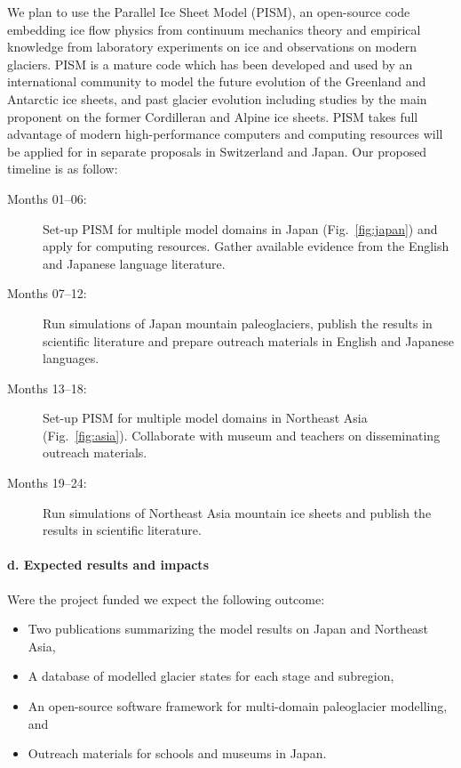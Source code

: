 \documentclass{article}
\begin{document}
    We plan to use the Parallel Ice Sheet Model (PISM), an open-source code
    embedding ice flow physics from continuum mechanics theory and empirical
    knowledge from laboratory experiments on ice and observations on modern
    glaciers. PISM is a mature code which has been developed and used by an
    international community to model the future evolution of the Greenland and
    Antarctic ice sheets, and past glacier evolution including studies by
    the main proponent on the former Cordilleran and Alpine ice sheets. PISM
    takes full advantage of modern high-performance computers and computing
    resources will be applied for in separate proposals in Switzerland and
    Japan. Our proposed timeline is as follow:
    \begin{description}
      \item[Months 01--06:]
        Set-up PISM for multiple model domains in Japan (Fig.~\ref{fig:japan})
        and apply for computing resources. Gather available evidence from the
        English and Japanese language literature.
      \item[Months 07--12:]
        Run simulations of Japan mountain paleoglaciers, publish the results in
        scientific literature and prepare outreach materials in English and
        Japanese languages.
      \item[Months 13--18:]
        Set-up PISM for multiple model domains in Northeast Asia
        (Fig.~\ref{fig:asia}). Collaborate with museum and teachers on
        disseminating outreach materials.
      \item[Months 19--24:]
        Run simulations of Northeast Asia mountain ice sheets and publish the
        results in scientific literature.
    \end{description}


\paragraph{d. Expected results and impacts}

    Were the project funded we expect the following outcome:

    \begin{itemize}
      \item{Two publications summarizing the model results on Japan and
            Northeast Asia,}
      \item{A database of modelled glacier states for each stage and
            subregion,}
      \item{An open-source software framework for multi-domain paleoglacier
            modelling, and}
      \item{Outreach materials for schools and museums in Japan.}
    \end{itemize}
\end{document}
